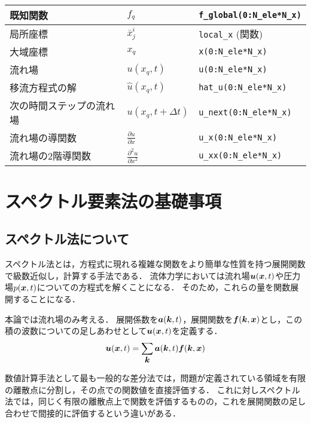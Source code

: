 \documentclass[12pt,a4paper]{jsarticle}
\def\vector#1{\mbox{\boldmath $#1$}}
\begin{document}
\begin{longtable}{lll}
    既知関数     & $f_{q}$ & \texttt{f\_global(0:N\_ele*N\_x)} \\ \hline
    局所座標     & $\bar{x}_{j}^i$ & \texttt{local\_x} (関数) \\ \hline
    大域座標     & $x_{q}$ & \texttt{x(0:N\_ele*N\_x)} \\ \hline
    流れ場      & $u(x_{q},t)$ & \texttt{u(0:N\_ele*N\_x)} \\ \hline
    移流方程式の解  & $\hat{u}(x_{q},t)$ & \texttt{hat\_u(0:N\_ele*N\_x)} \\ \hline
    次の時間ステップの流れ場      & $u(x_{q},t+\Delta t)$ & \texttt{u\_next(0:N\_ele*N\_x)} \\ \hline
    流れ場の導関数 & $\frac{\partial u}{\partial x}$ & \texttt{u\_x(0:N\_ele*N\_x)} \\ \hline
    流れ場の2階導関数 & $\frac{\partial^2 u}{\partial x^2}$ & \texttt{u\_xx(0:N\_ele*N\_x)} \\ \hline
\end{longtable}


\clearpage
\section{スペクトル要素法の基礎事項}
\label{sec:SpectralElementMehod}

\subsection{スペクトル法について}
\label{subsec:SpectralMehod}
スペクトル法とは，方程式に現れる複雑な関数をより簡単な性質を持つ展開関数で級数近似し，計算する手法である．
流体力学においては流れ場$\vector{u}(\vector{x},t)$や圧力場$p(\vector{x},t)$についての方程式を解くことになる．
そのため，これらの量を関数展開することになる．

本論では流れ場のみ考える．
展開係数を$\vector{a}(\vector{k},t)$，展開関数を$\vector{f}(\vector{k},\vector{x})$とし，この積の波数についての足しあわせとして$\vector{u}(\vector{x},t)$を定義する．
\begin{equation}
  \vector{u}(\vector{x},t) = \sum_{\vector{k}} \vector{a} (\vector{k},t) \vector{f} (\vector{k},\vector{x})
\label{eq:DefofSpectral}
\end{equation}

数値計算手法として最も一般的な差分法では，問題が定義されている領域を有限の離散点に分割し，その点での関数値を直接評価する．
これに対しスペクトル法では，同じく有限の離散点上で関数を評価するものの，これを展開関数の足し合わせで間接的に評価するという違いがある．\\
\end{document}
